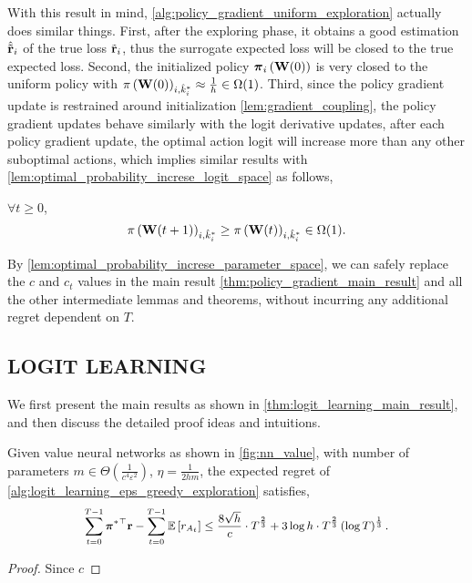 With this result in mind, \cref{alg:policy_gradient_uniform_exploration} actually does similar things. First, after the exploring phase, it obtains a good estimation $\hat{{\tilde{\mathbf{r}}}}_i$ of the true loss ${\tilde{\mathbf{r}}}_i$, thus the surrogate expected loss will be closed to the true expected loss. Second, the initialized policy ${\boldsymbol{\pi}}_i\left( {\mathbf{W}}(0) \right)$ is very closed to the uniform policy with $\pi\left( {\mathbf{W}}(0)\right)_{i, \hat{k}_i^*} \approx \frac{1}{h} \in \Omega(1)$. Third, since the policy gradient update is restrained around initialization \cref{lem:gradient_coupling}, the policy gradient updates behave similarly with the logit derivative updates, after each policy gradient update, the optimal action logit will increase more than any other  suboptimal actions, which implies similar results with \cref{lem:optimal_probability_increse_logit_space} as follows,
\begin{lem}
\label{lem:optimal_probability_increse_parameter_space}
$\forall t \ge 0$,
\begin{equation*}
    \pi\left( {\mathbf{W}}(t+1)\right)_{i,\hat{k}_i^*} \ge \pi\left( {\mathbf{W}}(t)\right)_{i,\hat{k}_i^*} \in \Omega(1).
\end{equation*}
\end{lem}
By \cref{lem:optimal_probability_increse_parameter_space}, we can safely replace the $c$ and $c_t$ values in the main result \cref{thm:policy_gradient_main_result} and all the other intermediate lemmas and theorems, without incurring any additional regret dependent on $T$.

\subsection{LOGIT LEARNING}
\label{subsec:theoretical_analyses_logit_learning}

We first present the main results as shown in \cref{thm:logit_learning_main_result}, and then discuss the detailed proof ideas and intuitions.

\begin{thm}
\label{thm:logit_learning_main_result}
    Given value neural networks as shown in \cref{fig:nn_value}, with number of parameters $m \in \Theta\left( \frac{1}{c^4 \varepsilon^2} \right)$, $\eta = \frac{1}{2 h m}$, the expected regret of \cref{alg:logit_learning_eps_greedy_exploration} satisfies,
\begin{equation*}
\small
\begin{split}
    \sum\limits_{t=0}^{T-1}{ {\rvpi^*}^\top \rvr } - \sum\limits_{t=0}^{T-1}{ \sE \left[ r_{A_t} \right] } \le \frac{8 \sqrt{h}}{c} \cdot T^{\frac{2}{3}} + 3 \log{h} \cdot T^{\frac{2}{3}} \left(\log{T}\right)^{\frac{1}{3}}.
\end{split}
\end{equation*}
\end{thm}
\begin{proof}
    Since $c$    
\end{proof}